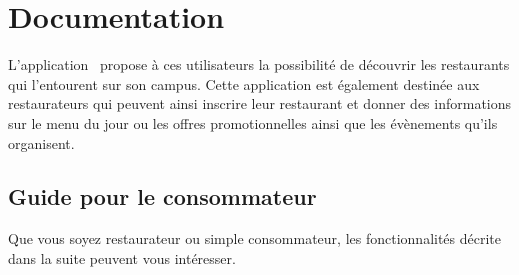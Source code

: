 \section{Documentation}

L'application \appname~propose à ces utilisateurs la possibilité de découvrir les restaurants qui l'entourent sur son campus. Cette application est également destinée aux restaurateurs qui peuvent ainsi inscrire leur restaurant et donner des informations sur le menu du jour ou les offres promotionnelles ainsi que les évènements qu'ils organisent.

\subsection{Guide pour le consommateur}

Que vous soyez restaurateur ou simple consommateur, les fonctionnalités décrite dans la suite peuvent vous intéresser. \\


